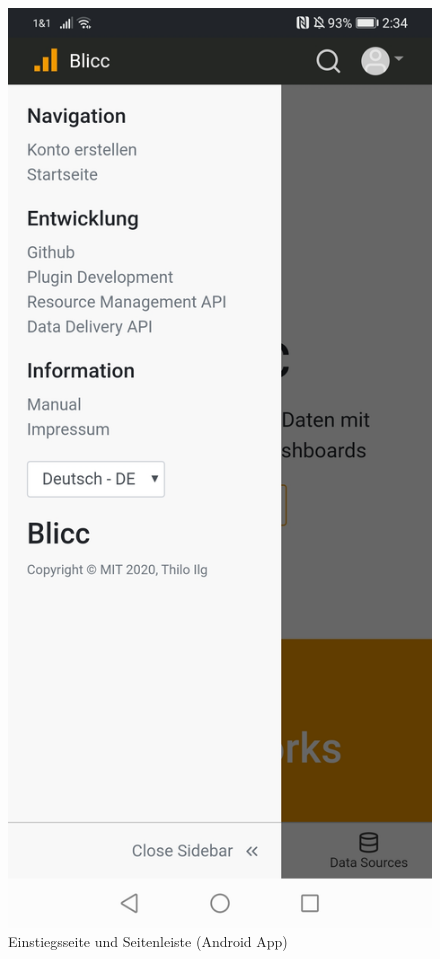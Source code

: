 \begin{figure}[h]
    \includegraphics[scale=0.1]{img/android/Sidebar}
    \caption{Einstiegsseite und Seitenleiste (Android App)}
    \label{figure:einstiegsseiteundseitenleiste}
\end{figure}

